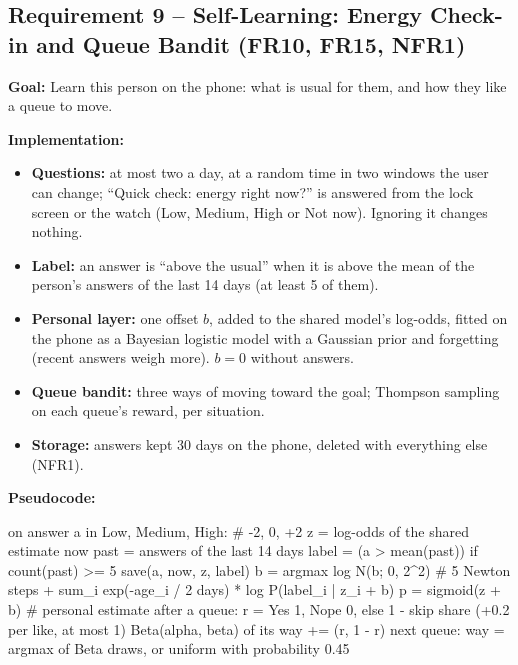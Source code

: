 \documentclass[conference]{IEEEtran}
\newcommand{\goal}[1]{\noindent\textbf{Goal:} #1\par\smallskip}
\newcommand{\impl}{\noindent\textbf{Implementation:}}
\newcommand{\pcode}{\noindent\textbf{Pseudocode:}}
\begin{document}
\subsection{Requirement 9 -- Self-Learning: Energy Check-in and Queue Bandit (FR10, FR15, NFR1)}\label{sec:req9}
\goal{Learn this person on the phone: what is usual for them, and how they like a queue to move.}
\impl
\begin{itemize}
\item \textbf{Questions:} at most two a day, at a random time in two windows the user can change; ``Quick check: energy right now?'' is answered from the lock screen or the watch (Low, Medium, High or Not now). Ignoring it changes nothing.
\item \textbf{Label:} an answer is ``above the usual'' when it is above the mean of the person's answers of the last 14 days (at least 5 of them).
\item \textbf{Personal layer:} one offset $b$, added to the shared model's log-odds, fitted on the phone as a Bayesian logistic model with a Gaussian prior and forgetting (recent answers weigh more). $b = 0$ without answers.
\item \textbf{Queue bandit:} three ways of moving toward the goal; Thompson sampling on each queue's reward, per situation.
\item \textbf{Storage:} answers kept 30 days on the phone, deleted with everything else (NFR1).
\end{itemize}
\par\noindent\begin{minipage}{\columnwidth}
\pcode
\begin{code}
on answer a in {Low, Medium, High}:  # -2, 0, +2
  z = log-odds of the shared estimate now
  past = answers of the last 14 days
  label = (a > mean(past)) if count(past) >= 5
  save(a, now, z, label)
b = argmax  log N(b; 0, 2^2)         # 5 Newton steps
    + sum_i exp(-age_i / 2 days)
            * log P(label_i | z_i + b)
p = sigmoid(z + b)               # personal estimate
after a queue:
  r = Yes 1, Nope 0, else 1 - skip share
      (+0.2 per like, at most 1)
  Beta(alpha, beta) of its way += (r, 1 - r)
next queue: way = argmax of Beta draws,
            or uniform with probability 0.45
\end{code}
\end{minipage}\par
\end{document}
